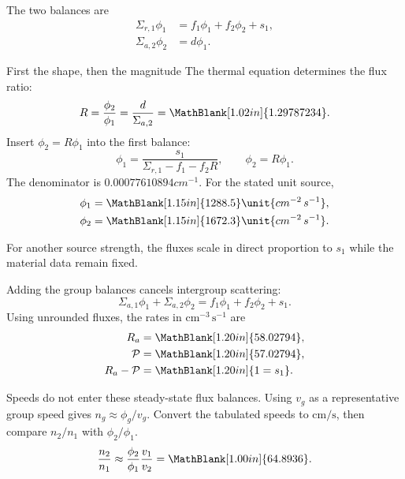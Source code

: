\begin{handoutcolumns}
\switchcolumn
\RaggedRight
{}
The two balances are
\begin{align*}
 \Sigma_{r,1}\phi_1&=f_1\phi_1+f_2\phi_2+s_1,\\
 \Sigma_{a,2}\phi_2&=d\phi_1.
\end{align*}
\begin{boardbox}{First the shape, then the magnitude}
The thermal equation determines the flux ratio:
\[
 R=\frac{\phi_2}{\phi_1}=\frac{d}{\Sigma_{a,2}}
 =\MathBlank[1.02in]{1.29787234}.
\]
Insert $\phi_2=R\phi_1$ into the first balance:
\[
 \boxed{\phi_1=\frac{s_1}{\Sigma_{r,1}-f_1-f_2R}},
 \qquad \boxed{\phi_2=R\phi_1}.
\]
The denominator is $0.00077610894\unit{cm^{-1}}$.
For the stated unit source,
\begin{align*}
 \phi_1&=\MathBlank[1.15in]{1288.5}\unit{cm^{-2}\,s^{-1}},\\
 \phi_2&=\MathBlank[1.15in]{1672.3}\unit{cm^{-2}\,s^{-1}}.
\end{align*}
\end{boardbox}
For another source strength, the fluxes scale in direct proportion
to $s_1$ while the material data remain fixed.

Adding the group balances cancels intergroup scattering:
\[
 \boxed{\Sigma_{a,1}\phi_1+\Sigma_{a,2}\phi_2
       =f_1\phi_1+f_2\phi_2+s_1}.
\]
Using unrounded fluxes, the rates in $\mathrm{cm^{-3}\,s^{-1}}$ are
\begin{align*}
 R_a&=\MathBlank[1.20in]{58.02794},\\
 \mathcal P&=\MathBlank[1.20in]{57.02794},\\
 R_a-\mathcal P&=\MathBlank[1.20in]{1=s_1}.
\end{align*}
\begin{checkpoint}
Speeds do not enter these steady-state flux balances. Using
$v_g$ as a representative group speed gives
$n_g\approx\phi_g/v_g$. Convert the tabulated speeds to
$\mathrm{cm/s}$, then compare $n_2/n_1$ with $\phi_2/\phi_1$.
\[
 \frac{n_2}{n_1}\approx
 \frac{\phi_2}{\phi_1}\frac{v_1}{v_2}
 =\MathBlank[1.00in]{64.8936}.
\]
\end{checkpoint}
\end{handoutcolumns}

